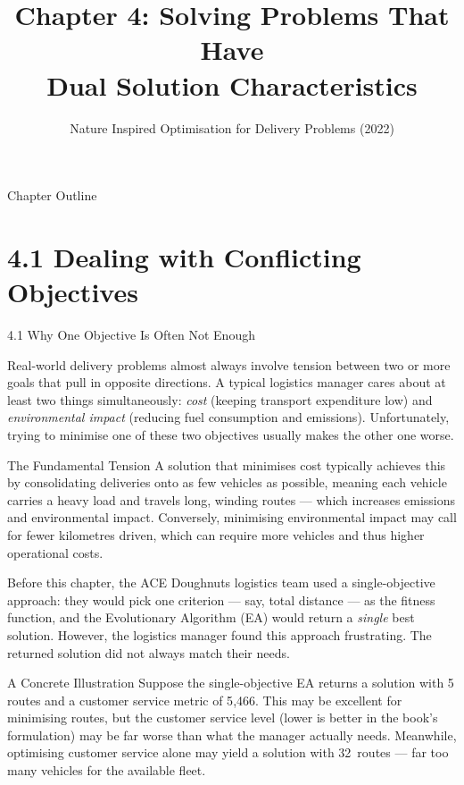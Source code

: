 \documentclass[aspectratio=169,10pt]{beamer}
\title[Ch.4 Dual Objectives]{Chapter 4: Solving Problems That Have\\
  Dual Solution Characteristics}
\subtitle{Nature Inspired Optimisation for Delivery Problems (2022)}
\author{}
\date{}
\begin{document}
\begin{frame}
  \titlepage
\end{frame}

\begin{frame}{Chapter Outline}
  \tableofcontents
\end{frame}

\section{4.1 Dealing with Conflicting Objectives}

\begin{frame}[allowframebreaks]{4.1 Why One Objective Is Often Not Enough}

  Real-world delivery problems almost always involve tension between two or more
  goals that pull in opposite directions.  A typical logistics manager cares about
  at least two things simultaneously: \emph{cost} (keeping transport expenditure
  low) and \emph{environmental impact} (reducing fuel consumption and emissions).
  Unfortunately, trying to minimise one of these two objectives usually makes the
  other one worse.

  \begin{block}{The Fundamental Tension}
    A solution that minimises cost typically achieves this by consolidating
    deliveries onto as few vehicles as possible, meaning each vehicle carries a
    heavy load and travels long, winding routes --- which increases emissions and
    environmental impact.  Conversely, minimising environmental impact may call for
    fewer kilometres driven, which can require more vehicles and thus higher
    operational costs.
  \end{block}

  \framebreak

  Before this chapter, the ACE Doughnuts logistics team used a single-objective
  approach: they would pick one criterion --- say, total distance --- as the fitness
  function, and the Evolutionary Algorithm (EA) would return a \emph{single}
  best solution.  However, the logistics manager found this approach frustrating.
  The returned solution did not always match their needs.

  \begin{exampleblock}{A Concrete Illustration}
    Suppose the single-objective EA returns a solution with 5 routes and a
    customer service metric of 5{,}466.  This may be excellent for minimising
    routes, but the customer service level (lower is better in the book's
    formulation) may be far worse than what the manager actually needs.
    Meanwhile, optimising customer service alone may yield a solution with
    32~routes --- far too many vehicles for the available fleet.
  \end{exampleblock}


\end{frame}
\end{document}

